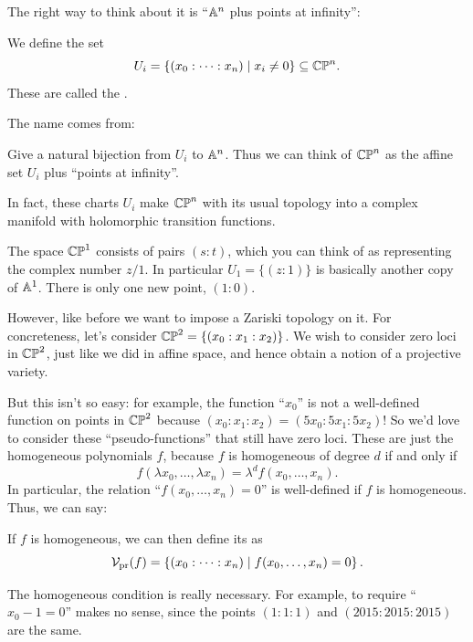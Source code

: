 The right way to think about it is ``$\mathbb A^n$ plus points at infinity'':
\begin{definition}
	We define the set
	\[ U_i = \left\{ (x_0 : \dots : x_n) \mid x_i \neq 0  \right\}
		\subseteq \mathbb{CP}^n. \]
	These are called the .
\end{definition}
The name comes from:
\begin{exercise}
	[Mandatory]
	Give a natural bijection from $U_i$ to $\mathbb A^n$.
	Thus we can think of $\mathbb{CP}^n$ as the affine set $U_i$
	plus ``points at infinity''.
\end{exercise}
\begin{remark}
	In fact, these charts $U_i$ make $\mathbb{CP}^n$ with its usual topology
	into a complex manifold with holomorphic transition functions.
\end{remark}

\begin{example}
	[Colloquially, $\CP^1 = \Aff^1 \cup \{\infty\}$]
	The space $\mathbb{CP}^1$ consists of pairs $(s:t)$,
	which you can think of as representing the complex number $z/1$.
	In particular $U_1 = \{ (z:1) \}$
	is basically another copy of $\mathbb A^1$.
	There is only one new point, $(1:0)$.
\end{example}

However, like before we want to impose a Zariski topology on it.
For concreteness, let's consider $\mathbb{CP}^2 = \left\{ (x_0 : x_1 : x_2) \right\}$.
We wish to consider zero loci in $\mathbb{CP}^2$, just like we did in affine space,
and hence obtain a notion of a projective variety.

But this isn't so easy: for example,
the function ``$x_0$'' is not a well-defined function on points in $\mathbb{CP}^2$
because $(x_0 : x_1 : x_2) = (5x_0 : 5x_1 : 5x_2)$!
So we'd love to consider these ``pseudo-functions''
that still have zero loci. These are just the homogeneous polynomials $f$,
because $f$ is homogeneous of degree $d$ if and only if
\[
	f(\lambda x_0, \dots, \lambda x_n)
	= \lambda^d f(x_0, \dots, x_n).
\]
In particular, the relation ``$f(x_0, \dots, x_n) = 0$'' is
well-defined if $f$ is homogeneous. Thus, we can say:
\begin{definition}
	If $f$ is homogeneous, we can then define its  as
	\[
		\mathcal V_{\text{pr}}(f)
		= \left\{ (x_0 : \dots : x_n) \mid f(x_0, \dots, x_n) = 0 \right\}.
	\]
\end{definition}

The homogeneous condition is really necessary.
For example, to require ``$x_0 - 1 = 0$'' makes no sense,
since the points $(1:1:1)$ and $(2015:2015:2015)$ are the same.

